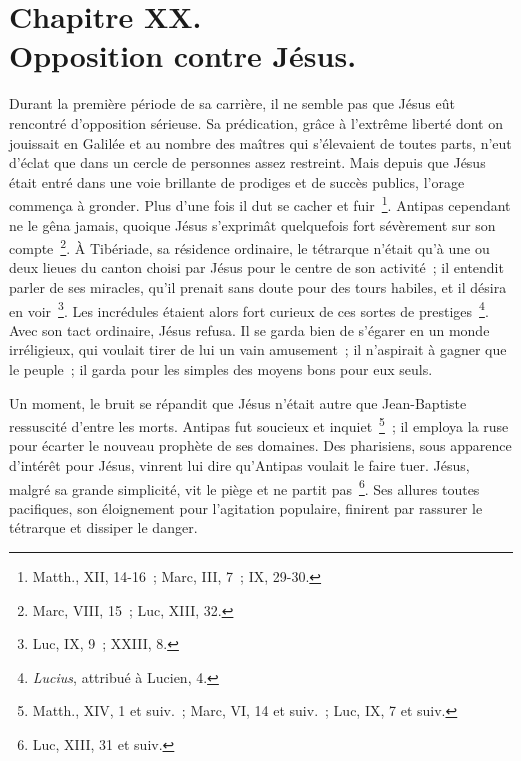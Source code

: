 \documentclass[french,twoside]{book} %
\newcommand\chapteropen{} %
\newcommand\chaptercont{} %
\begin{document}
\chapteropen
\chapter[{Chapitre XX. Opposition contre Jésus.}]{Chapitre XX.\\
Opposition contre Jésus.}\renewcommand{\leftmark}{Chapitre XX.\\
Opposition contre Jésus.}


\chaptercont
\noindent Durant la première période de sa carrière, il ne semble pas que Jésus eût rencontré d’opposition sérieuse. Sa prédication, grâce à l’extrême liberté dont on jouissait en Galilée et au nombre des maîtres qui s’élevaient de toutes parts, n’eut d’éclat que dans un cercle de personnes assez restreint. Mais depuis que Jésus était entré dans une voie brillante de prodiges et de succès publics, l’orage commença à gronder. Plus d’une fois il dut se cacher et fuir \footnote{Matth., XII, 14-16 ; Marc, III, 7 ; IX, 29-30.}. Antipas cependant ne le gêna jamais, quoique Jésus s’exprimât quelquefois fort sévèrement sur son compte \footnote{Marc, VIII, 15 ; Luc, XIII, 32.}. À Tibériade, sa résidence ordinaire, le tétrarque n’était qu’à une ou deux lieues du canton choisi par Jésus pour le centre de son activité ; il entendit parler de ses miracles, qu’il prenait sans doute pour des tours habiles, et il désira en voir \footnote{Luc, IX, 9 ; XXIII, 8.}. Les incrédules étaient alors fort curieux de ces sortes de prestiges \footnote{{\itshape Lucius}, attribué à Lucien, 4.}. Avec son tact ordinaire, Jésus refusa. Il se garda bien de s’égarer en un monde irréligieux, qui voulait tirer de lui un vain amusement ; il n’aspirait à gagner que le peuple ; il garda pour les simples des moyens bons pour eux seuls.\par
Un moment, le bruit se répandit que Jésus n’était autre que Jean-Baptiste ressuscité d’entre les morts. Antipas fut soucieux et inquiet \footnote{Matth., XIV, 1 et suiv. ; Marc, VI, 14 et suiv. ; Luc, IX, 7 et suiv.} ; il employa la ruse pour écarter le nouveau prophète de ses domaines. Des pharisiens, sous apparence d’intérêt pour Jésus, vinrent lui dire qu’Antipas voulait le faire tuer. Jésus, malgré sa grande simplicité, vit le piège et ne partit pas \footnote{Luc, XIII, 31 et suiv.}. Ses allures toutes pacifiques, son éloignement pour l’agitation populaire, finirent par rassurer le tétrarque et dissiper le danger.\par
\end{document}
